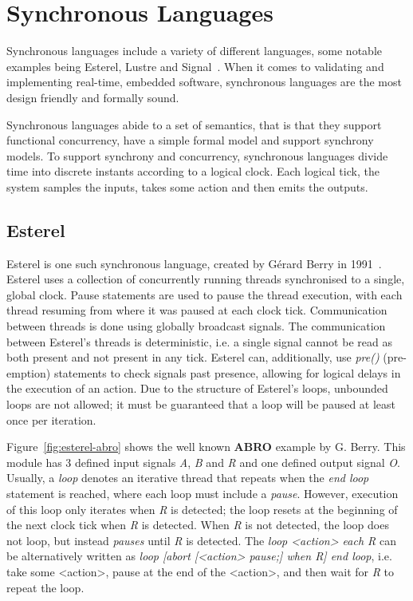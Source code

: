 \section{Synchronous Languages}
Synchronous languages include a variety of different languages, some notable examples being Esterel, Lustre and Signal~\cite{benveniste2003synchronous}.
When it comes to validating and implementing real-time, embedded software, synchronous languages are the most design friendly and formally sound.

Synchronous languages abide to a set of semantics, that is that they support functional concurrency, have a simple formal model and support synchrony models.
To support synchrony and concurrency, synchronous languages divide time into discrete instants according to a logical clock.
Each logical tick, the system samples the inputs, takes some action and then emits the outputs.

\subsection{Esterel}
Esterel is one such synchronous language, created by Gérard Berry in 1991~\cite{berry1991}. 
Esterel uses a collection of concurrently running threads synchronised to a single, global clock.
Pause statements are used to pause the thread execution, with each thread resuming from where it was paused at each clock tick.
Communication between threads is done using globally broadcast signals.
The communication between Esterel's threads is deterministic, i.e. a single signal cannot be read as both present and not present in any tick.
Esterel can, additionally, use \textit{pre()} (pre-emption) statements to check signals past presence, allowing for logical delays in the execution of an action.
Due to the structure of Esterel's loops, unbounded loops are not allowed; it must be guaranteed that a loop will be paused at least once per iteration.

Figure~\ref{fig:esterel-abro} shows the well known \textbf{ABRO} example by G. Berry.
This module has 3 defined input signals \textit{A}, \textit{B} and \textit{R} and one defined output signal \textit{O}.
Usually, a \textit{loop} denotes an iterative thread that repeats when the \textit{end loop} statement is reached, where each loop must include a \textit{pause}. 
However, execution of this loop only iterates when \textit{R} is detected; the loop resets at the beginning of the next clock tick when \textit{R} is detected.
When \textit{R} is not detected, the loop does not loop, but instead \textit{pauses} until \textit{R} is detected.
The \textit{loop <action> each R} can be alternatively written as \textit{loop [abort [<action> pause;] when R] end loop}, i.e. take some <action>, pause at the end of the <action>, and then wait for \textit{R} to repeat the loop.

